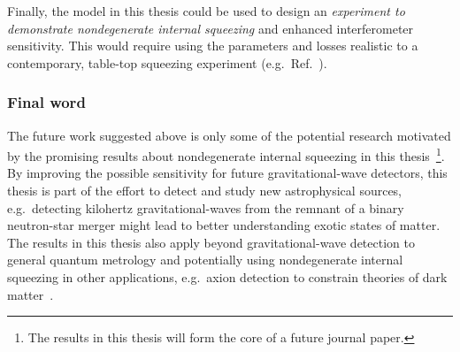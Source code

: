 

Finally, the model in this thesis could be used to design an \emph{experiment to demonstrate nondegenerate internal squeezing} and enhanced interferometer sensitivity. This would require using the parameters and losses realistic to a contemporary, table-top squeezing experiment (e.g.\ Ref.~\cite{sudbeck2020demonstration}). %


\subsubsection{Final word}
The future work suggested above is only some of the potential research motivated by the promising results about nondegenerate internal squeezing in this thesis~\footnote{The results in this thesis will form the core of a future journal paper.}.
By improving the possible sensitivity for future gravitational-wave detectors, this thesis is part of the effort to detect and study new astrophysical sources, e.g.\ detecting kilohertz gravitational-waves from the remnant of a binary neutron-star merger might lead to better understanding exotic states of matter.
The results in this thesis also apply beyond gravitational-wave detection to general quantum metrology and potentially using nondegenerate internal squeezing in other applications, e.g.\ axion detection to constrain theories of dark matter~\cite{MARSH20161,PhysRevX.9.021023,liBroadbandSensitivityImprovement2020}.


